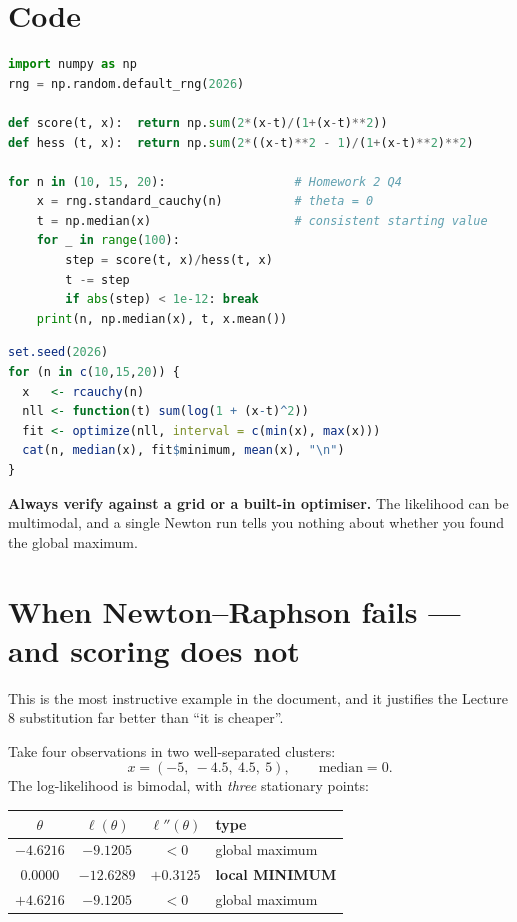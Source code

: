 \documentclass[11pt]{article}
\begin{document}
\section{Code}

\begin{lstlisting}[language=Python]
import numpy as np
rng = np.random.default_rng(2026)

def score(t, x):  return np.sum(2*(x-t)/(1+(x-t)**2))
def hess (t, x):  return np.sum(2*((x-t)**2 - 1)/(1+(x-t)**2)**2)

for n in (10, 15, 20):                  # Homework 2 Q4
    x = rng.standard_cauchy(n)          # theta = 0
    t = np.median(x)                    # consistent starting value
    for _ in range(100):
        step = score(t, x)/hess(t, x)
        t -= step
        if abs(step) < 1e-12: break
    print(n, np.median(x), t, x.mean())
\end{lstlisting}

\begin{lstlisting}[language=R]
set.seed(2026)
for (n in c(10,15,20)) {
  x   <- rcauchy(n)
  nll <- function(t) sum(log(1 + (x-t)^2))
  fit <- optimize(nll, interval = c(min(x), max(x)))
  cat(n, median(x), fit$minimum, mean(x), "\n")
}
\end{lstlisting}

\noindent
\textbf{Always verify against a grid or a built-in optimiser.} The likelihood can be
multimodal, and a single Newton run tells you nothing about whether you found the global
maximum.

\section{When Newton--Raphson fails --- and scoring does not}

This is the most instructive example in the document, and it justifies the Lecture 8
substitution far better than ``it is cheaper''.

Take four observations in two well-separated clusters:
\[
x=(-5,\ -4.5,\ 4.5,\ 5),\qquad \text{median}=0 .
\]
The log-likelihood is bimodal, with \emph{three} stationary points:
\begin{center}
\renewcommand{\arraystretch}{1.3}
\begin{tabular}{@{}cccl@{}}
\toprule
$\theta$ & $\ell(\theta)$ & $\ell''(\theta)$ & type \\
\midrule
$-4.6216$ & $-9.1205$ & $<0$ & global maximum \\
$0.0000$ & $-12.6289$ & $\mathbf{+0.3125}$ & \textbf{local MINIMUM} \\
$+4.6216$ & $-9.1205$ & $<0$ & global maximum \\
\bottomrule
\end{tabular}
\end{center}
\end{document}
